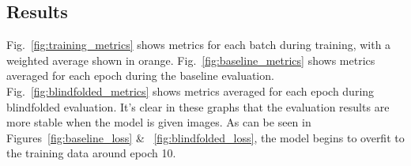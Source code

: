 \subsection{Results}
Fig.~\ref{fig:training_metrics} shows metrics for each batch during training, with a weighted average shown in orange. %
Fig.~\ref{fig:baseline_metrics} shows metrics averaged for each epoch during the baseline evaluation. Fig.~\ref{fig:blindfolded_metrics} shows metrics averaged for each epoch during blindfolded evaluation. It's clear in these graphs that the evaluation results are more stable when the model is given images. As can be seen in Figures~\ref{fig:baseline_loss} \& ~\ref{fig:blindfolded_loss}, the model begins to overfit to the training data around epoch 10.

